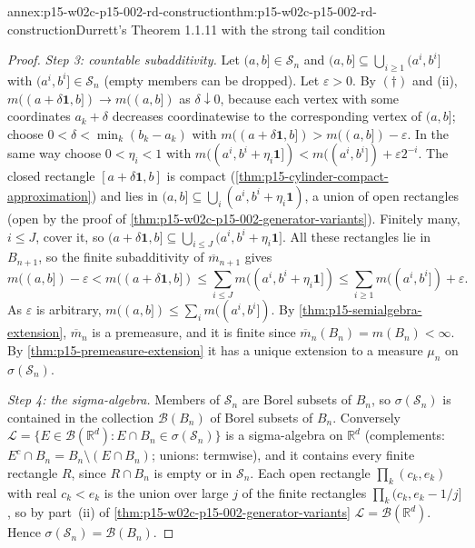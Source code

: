 \begin{annexitem}{annex:p15-w02c-p15-002-rd-construction}{thm:p15-w02c-p15-002-rd-construction}{Durrett's Theorem 1.1.11 with the strong tail condition}
\begin{proof}
\emph{Step 3: countable subadditivity.} Let \((a,b]\in\mathcal S_n\) and
\((a,b]\subseteq\bigcup_{i\geq1}(a^i,b^i]\) with
\((a^i,b^i]\in\mathcal S_n\) (empty members can be dropped). Let
\(\varepsilon>0\). By \((\dagger)\) and (ii), \(m((a+\delta\mathbf1,b])\to
m((a,b])\) as \(\delta\downarrow0\), because each vertex with some
coordinates \(a_k+\delta\) decreases coordinatewise to the corresponding
vertex of \((a,b]\); choose \(0<\delta<\min_k(b_k-a_k)\) with
\(m((a+\delta\mathbf1,b])>m((a,b])-\varepsilon\). In the same way choose
\(0<\eta_i<1\) with
\(m((a^i,b^i+\eta_i\mathbf1])<m((a^i,b^i])+\varepsilon2^{-i}\). The
closed rectangle \([a+\delta\mathbf1,b]\) is compact
(\cref{thm:p15-cylinder-compact-approximation}) and lies in
\((a,b]\subseteq\bigcup_i(a^i,b^i+\eta_i\mathbf1)\), a union of open
rectangles (open by the proof of
\cref{thm:p15-w02c-p15-002-generator-variants}). Finitely many,
\(i\leq J\), cover it, so
\((a+\delta\mathbf1,b]\subseteq\bigcup_{i\leq J}(a^i,b^i+\eta_i\mathbf1]\).
All these rectangles lie in \(B_{n+1}\), so the finite subadditivity of
\(\overline m_{n+1}\) gives
\[
 m((a,b])-\varepsilon<m((a+\delta\mathbf1,b])
 \leq\sum_{i\leq J}m((a^i,b^i+\eta_i\mathbf1])
 \leq\sum_{i\geq1}m((a^i,b^i])+\varepsilon .
\]
As \(\varepsilon\) is arbitrary,
\(m((a,b])\leq\sum_im((a^i,b^i])\). By
\cref{thm:p15-semialgebra-extension}, \(\overline m_n\) is a premeasure, and
it is finite since \(\overline m_n(B_n)=m(B_n)<\infty\). By
\cref{thm:p15-premeasure-extension} it has a unique extension to a measure
\(\mu_n\) on \(\sigma(\mathcal S_n)\).

\emph{Step 4: the sigma-algebra.} Members of \(\mathcal S_n\) are Borel
subsets of \(B_n\), so \(\sigma(\mathcal S_n)\) is contained in the
collection \(\mathcal B(B_n)\) of Borel subsets of \(B_n\). Conversely
\(\mathcal L=\{E\in\mathcal B(\mathbb R^d):E\cap B_n\in\sigma(\mathcal S_n)\}\)
is a sigma-algebra on \(\mathbb R^d\) (complements: \(E^c\cap B_n=B_n\setminus
(E\cap B_n)\); unions: termwise), and it contains every finite rectangle
\(R\), since \(R\cap B_n\) is empty or in \(\mathcal S_n\). Each open
rectangle \(\prod_k(c_k,e_k)\) with real \(c_k<e_k\) is the union over
large \(j\) of the finite rectangles \(\prod_k(c_k,e_k-1/j]\), so by
part~(ii) of \cref{thm:p15-w02c-p15-002-generator-variants}
\(\mathcal L=\mathcal B(\mathbb R^d)\). Hence
\(\sigma(\mathcal S_n)=\mathcal B(B_n)\).


\end{proof}
\end{annexitem}
